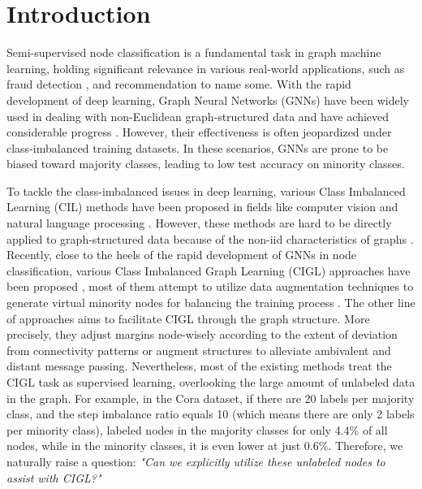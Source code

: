 \section{Introduction}

Semi-supervised node classification is a fundamental task in graph machine learning, holding significant relevance in various real-world applications, such as fraud detection \cite{li2022devil, dou2020enhancing}, and recommendation \cite{zhao2023sequential,zhao2024collaborative} to name some. With the rapid development of deep learning, Graph Neural Networks (GNNs) have been widely used in dealing with non-Euclidean graph-structured data and have achieved considerable progress \cite{zhang2024graph2,luo2024classic,li2024gslb,zhang2025survey,li2023survey,li2024glbench,li2024zerog}. However, their effectiveness is often jeopardized under class-imbalanced training datasets. In these scenarios, GNNs are prone to be biased toward majority classes, leading to low test accuracy on minority classes.


To tackle the class-imbalanced issues in deep learning, various Class Imbalanced Learning (CIL) methods have been proposed in fields like computer vision and natural language processing \cite{lin2017focal,cui2019class,kang2019decoupling}. However, these methods are hard to be directly applied to graph-structured data because of the non-iid characteristics of graphs \cite{song2022tam}. Recently, close to the heels of the rapid development of GNNs in node classification, various Class Imbalanced Graph Learning (CIGL) approaches have been proposed \cite{park2021graphens, song2022tam, zhao2021graphsmote, shi2020multi}, most of them attempt to utilize data augmentation techniques to generate virtual minority nodes for balancing the training process \cite{park2021graphens, zhao2021graphsmote, qu2021imgagn}. The other line of approaches aims to facilitate CIGL through the graph structure. More precisely, they adjust margins node-wisely according to the extent of deviation from connectivity patterns or augment structures to alleviate ambivalent and distant message passing. Nevertheless, most of the existing methods treat the CIGL task as supervised learning, overlooking the large amount of unlabeled data in the graph. For example, in the Cora dataset, if there are 20 labels per majority class, and the step imbalance ratio equals 10 (which means there are only 2 labels per minority class), labeled nodes in the majority classes for only 4.4\% of all nodes, while in the minority classes, it is even lower at just 0.6\%. Therefore, we naturally raise a question:
\emph{"Can we explicitly utilize these unlabeled nodes to assist with CIGL?"}

